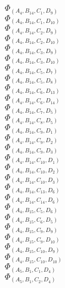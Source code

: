 \documentclass[14pt]{article}
\begin{document}
    $\Phi_{({A}_{4}, {B}_{14}, {C}_{1}, {D}_{9})}$ \\ 
    $\Phi_{({A}_{4}, {B}_{14}, {C}_{1}, {D}_{10})}$ \\ 
    $\Phi_{({A}_{4}, {B}_{14}, {C}_{2}, {D}_{9})}$ \\ 
    $\Phi_{({A}_{4}, {B}_{14}, {C}_{2}, {D}_{10})}$ \\ 
    $\Phi_{({A}_{4}, {B}_{14}, {C}_{3}, {D}_{9})}$ \\ 
    $\Phi_{({A}_{4}, {B}_{14}, {C}_{3}, {D}_{10})}$ \\ 
    $\Phi_{({A}_{4}, {B}_{14}, {C}_{5}, {D}_{7})}$ \\ 
    $\Phi_{({A}_{4}, {B}_{14}, {C}_{5}, {D}_{8})}$ \\ 
    $\Phi_{({A}_{4}, {B}_{14}, {C}_{6}, {D}_{13})}$ \\ 
    $\Phi_{({A}_{4}, {B}_{14}, {C}_{6}, {D}_{14})}$ \\ 
    $\Phi_{({A}_{4}, {B}_{14}, {C}_{7}, {D}_{5})}$ \\ 
    $\Phi_{({A}_{4}, {B}_{14}, {C}_{8}, {D}_{5})}$ \\ 
    $\Phi_{({A}_{4}, {B}_{14}, {C}_{9}, {D}_{1})}$ \\ 
    $\Phi_{({A}_{4}, {B}_{14}, {C}_{9}, {D}_{2})}$ \\ 
    $\Phi_{({A}_{4}, {B}_{14}, {C}_{9}, {D}_{3})}$ \\ 
    $\Phi_{({A}_{4}, {B}_{14}, {C}_{10}, {D}_{1})}$ \\ 
    $\Phi_{({A}_{4}, {B}_{14}, {C}_{10}, {D}_{2})}$ \\ 
    $\Phi_{({A}_{4}, {B}_{14}, {C}_{10}, {D}_{3})}$ \\ 
    $\Phi_{({A}_{4}, {B}_{14}, {C}_{13}, {D}_{6})}$ \\ 
    $\Phi_{({A}_{4}, {B}_{14}, {C}_{14}, {D}_{6})}$ \\ 
    $\Phi_{({A}_{4}, {B}_{15}, {C}_{5}, {D}_{6})}$ \\ 
    $\Phi_{({A}_{4}, {B}_{15}, {C}_{6}, {D}_{5})}$ \\ 
    $\Phi_{({A}_{4}, {B}_{15}, {C}_{9}, {D}_{9})}$ \\ 
    $\Phi_{({A}_{4}, {B}_{15}, {C}_{9}, {D}_{10})}$ \\ 
    $\Phi_{({A}_{4}, {B}_{15}, {C}_{10}, {D}_{9})}$ \\ 
    $\Phi_{({A}_{4}, {B}_{15}, {C}_{10}, {D}_{10})}$ \\ 
    $\Phi_{({A}_{5}, {B}_{1}, {C}_{1}, {D}_{4})}$ \\ 
    $\Phi_{({A}_{5}, {B}_{1}, {C}_{2}, {D}_{4})}$ \\ 
\end{document}
